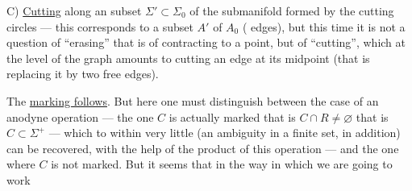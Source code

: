 C) \uline{Cutting}  along an  subset
$\Sigma'\subset\Sigma_0$ of the submanifold formed by the cutting circles --- this corresponds to a subset $A'$ of $A_0$ (  edges), but this time it is not a question of ``erasing'' that is of contracting to a point, but of ``cutting'', which at the level of the graph amounts to cutting an edge at its midpoint (that is replacing it by two free edges).

The \uline{marking follows}. 
But here one must distinguish between the case of an anodyne operation  --- the one
$C$ is actually marked that is $C\cap R\ne\varnothing$ that is $C\subset\Sigma^+$ --- which to within very little (an ambiguity in a finite set, \deleted{)} in addition) can be recovered, with the help of the product of this operation --- and the one where $C$ is not marked.
But it seems that in the way in which we are going to work
